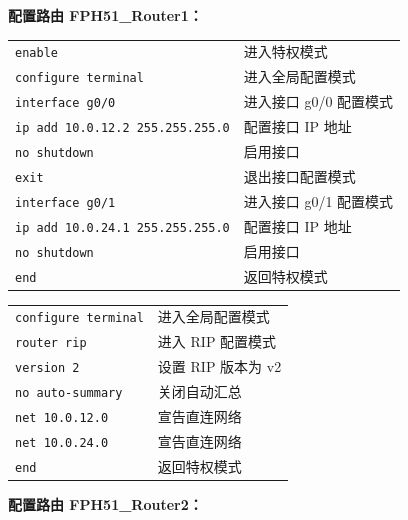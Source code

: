\documentclass[UTF8,12pt,a4paper]{ctexart}
\begin{document}
\bigskip
\noindent\textbf{配置路由 FPH51\_Router1：}

\medskip
\begin{tabular}{p{7cm} p{7cm}}
\texttt{enable} & 进入特权模式 \\
\texttt{configure terminal} & 进入全局配置模式 \\

\texttt{interface g0/0} & 进入接口 g0/0 配置模式 \\
\texttt{ip add 10.0.12.2 255.255.255.0} & 配置接口 IP 地址 \\
\texttt{no shutdown} & 启用接口 \\
\texttt{exit} & 退出接口配置模式 \\

\texttt{interface g0/1} & 进入接口 g0/1 配置模式 \\
\texttt{ip add 10.0.24.1 255.255.255.0} & 配置接口 IP 地址 \\
\texttt{no shutdown} & 启用接口 \\

\texttt{end} & 返回特权模式 \\
\end{tabular}

\bigskip
\begin{tabular}{p{7cm} p{7cm}}
\texttt{configure terminal} & 进入全局配置模式 \\
\texttt{router rip} & 进入 RIP 配置模式 \\
\texttt{version 2} & 设置 RIP 版本为 v2 \\
\texttt{no auto-summary} & 关闭自动汇总 \\
\texttt{net 10.0.12.0} & 宣告直连网络 \\
\texttt{net 10.0.24.0} & 宣告直连网络 \\
\texttt{end} & 返回特权模式 \\
\end{tabular}

\bigskip
\noindent\textbf{配置路由 FPH51\_Router2：}
\end{document}
